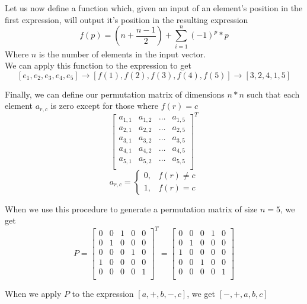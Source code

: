 \documentclass[./Research.tex]{subfiles}
\begin{document}
	Let us now define a function which, given an input of an element's position in the first expression, will output it's position in the resulting expression
		$$f(p) = (n + \frac{n-1}{2}) + \sum\limits_{i=1}^n (-1)^p * p$$
	Where $n$ is the number of elements in the input vector. \\
	
	We can apply this function to the expression to get
		$$[e_{1}, e_{2}, e_{3}, e_{4}, e_{5}] 
		\rightarrow [f(1),f(2),f(3),f(4),f(5)] 
		\rightarrow [3,2,4,1,5] $$
		
	Finally, we can define our permutation matrix of dimensions $n*n$ such that each element $a_{r,c}$ is zero except for those where $f(r) = c$
		 \[ \begin{bmatrix}
    		a_{1,1} & a_{1,2} & \dots & a_{1,5} \\
    		a_{2,1} & a_{2,2} & \dots & a_{2,5} \\
    		a_{3,1} & a_{3,2} & \dots & a_{3,5} \\
    		a_{4,1} & a_{4,2} & \dots & a_{4,5} \\
    		a_{5,1} & a_{5,2} & \dots & a_{5,5} \\
		\end{bmatrix}^{\!T} \]
		$$ a_{r,c} = 
		\begin{cases} 
		0, & f(r) \neq c \\
		1, & f(r) = c
		\end{cases} $$

	When we use this procedure to generate a permutation matrix of size $n = 5$, we get
		\[ P =
		\begin{bmatrix}
    		0 & 0 & 1 & 0 & 0 \\
    		0 & 1 & 0 & 0 & 0 \\
    		0 & 0 & 0 & 1 & 0 \\
    		1 & 0 & 0 & 0 & 0 \\
    		0 & 0 & 0 & 0 & 1 \\
		\end{bmatrix}^{\!T}
			=
		\begin{bmatrix}
    		0 & 0 & 0 & 1 & 0 \\
    		0 & 1 & 0 & 0 & 0 \\
    		1 & 0 & 0 & 0 & 0 \\
    		0 & 0 & 1 & 0 & 0 \\
    		0 & 0 & 0 & 0 & 1 \\
		\end{bmatrix} \]

	When we apply $P$ to the expression $[a, +, b, -, c]$, we get $[-, +, a, b, c]$
	
\end{document}
